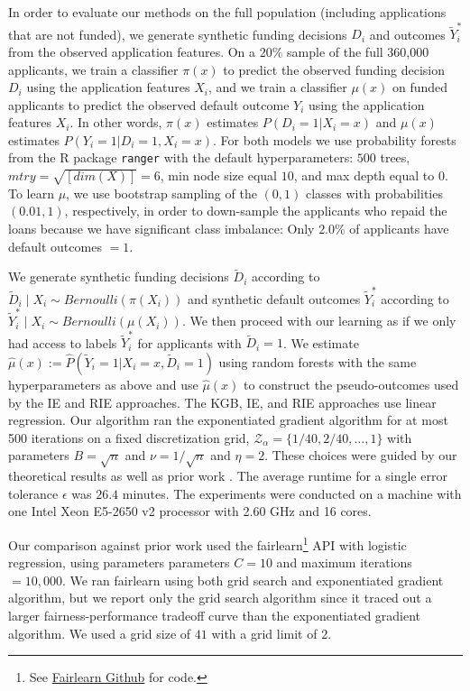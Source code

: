 \documentclass{article}
\begin{document}
In order to evaluate our methods on the full population (including applications that are not funded), we generate synthetic funding decisions $D_i$ and outcomes $\tilde Y_i^*$ from the observed application features. On a $20\%$ sample of the full 360,000 applicants, we train a classifier $\pi(x) $ to predict the observed funding decision $D_i$ using the application features $X_i$, and we train a classifier $\mu(x)$ on funded applicants to predict the observed default outcome $Y_i$ using the application features $X_i$. In other words, $\pi(x)$ estimates $P(D_i = 1 | X_i = x)$ and $\mu(x)$ estimates $P(Y_i = 1 | D_i = 1, X_i = x)$. For both models we use probability forests from the R package {\tt ranger} with the default hyperparameters: $500$ trees, $mtry = \sqrt{[dim(X)]} = 6$, min node size equal $10$, and max depth equal to $0$. To learn $\mu$, we use bootstrap sampling of the $(0,1)$ classes with probabilities $(0.01, 1)$, respectively, in order to down-sample the applicants who repaid the loans because we have significant class imbalance: Only $2.0\%$ of applicants have default outcomes $=1$.

We generate synthetic funding decisions $\tilde D_i$ according to $\widetilde D_i \mid X_i \sim Bernoulli(\pi(X_i))$ and synthetic default outcomes $\widetilde Y_i^*$ according to $\widetilde Y_i^* \mid X_i \sim Bernoulli(\mu(X_i))$. 
We then proceed with our learning as if we only had access to labels $\widetilde Y_i^*$ for applicants with $\widetilde D_i = 1$. We estimate $\hat \mu(x) := \hat{P}(\widetilde Y_i = 1 | X_i = x, \widetilde D_i =1)$ using random forests with the same hyperparameters as above and use $\hat \mu(x)$ to construct the pseudo-outcomes used by the IE and RIE approaches. The KGB, IE, and RIE approaches use linear regression. Our \fairs algorithm ran the exponentiated gradient algorithm for at most 500 iterations on a fixed discretization grid, $\mathcal{Z}_\alpha = \{1/40, 2/40,\hdots, 1\}$ with parameters $B = \sqrt{n}$ and $\nu = 1/\sqrt{n}$ and $\eta = 2$. These choices were guided by our theoretical results as well as prior work \cite{AgarwalEtAl(19)-FairRegression}. The average runtime for a single error tolerance $\epsilon$ was $26.4$ minutes.
The experiments were conducted on a machine with one Intel Xeon E5-2650 v2 processor with 2.60 GHz and 16 cores. 

Our comparison against prior work used the fairlearn\footnote{See \href{https://fairlearn.github.io/v0.5.0/api_reference/fairlearn.reductions.html}{Fairlearn Github} for code.} API with logistic regression, using parameters parameters $C=10$ and maximum iterations $=10,000$. We ran fairlearn using both grid search and exponentiated gradient algorithm, but we report only the grid search algorithm since it traced out a larger fairness-performance tradeoff curve than the exponentiated gradient algorithm. We used a grid size of $41$ with a grid limit of $2$. 
\end{document}
